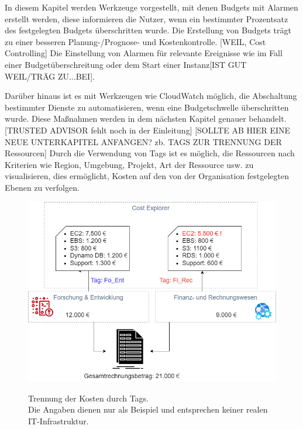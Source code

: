 In diesem Kapitel werden Werkzeuge vorgestellt, mit denen Budgets mit Alarmen erstellt werden, diese informieren die Nutzer, wenn ein bestimmter Prozentsatz des festgelegten Budgets überschritten wurde. Die Erstellung von Budgets trägt zu einer besseren Planung-/Prognose- und Kostenkontrolle. [WEIL, Cost Controlling]
Die Einstellung von Alarmen für relevante Ereignisse wie im Fall einer Budgetüberschreitung oder dem Start einer Instanz[IST GUT WEIL/TRÄG ZU...BEI].

Darüber hinaus ist es mit Werkzeugen wie CloudWatch möglich, die Abschaltung bestimmter Dienste zu automatisieren, wenn eine Budgetschwelle überschritten wurde. Diese Maßnahmen werden in dem nächsten Kapitel genauer behandelt.
[TRUSTED ADVISOR fehlt noch in der Einleitung]
[SOLLTE AB HIER EINE NEUE UNTERKAPITEL ANFANGEN? zb. TAGS ZUR TRENNUNG DER Ressourcen]
Durch die Verwendung von Tags ist es möglich, die Ressourcen nach Kriterien wie Region, Umgebung, Projekt, Art der Ressource usw. zu visualisieren, dies %
ermöglicht, Kosten auf den von der Organisation festgelegten Ebenen zu verfolgen.

\begin{figure}[h!]
  \centering
  \includegraphics[scale=0.4]{sources/Kosten_Ueber_Abteilungen}
  \caption[Trennung der Kosten durch Tags]{}
  \label{fig:Kosten_Ueber_Abteilungen} 
  Trennung der Kosten durch Tags.\\
  Die Angaben dienen nur als Beispiel und entsprechen keiner realen IT-Infrastruktur.
\end{figure}

